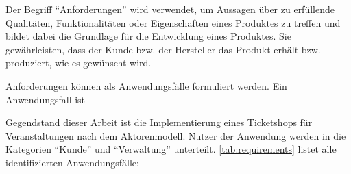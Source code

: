 Der Begriff \enquote{Anforderungen} wird verwendet, um Aussagen über zu erfüllende Qualitäten, Funktionalitäten oder Eigenschaften eines Produktes zu treffen und bildet dabei die Grundlage für die Entwicklung eines Produktes.
Sie gewährleisten, dass der Kunde bzw. der Hersteller das Produkt erhält bzw. produziert, wie es gewünscht wird.\unskip{}

Anforderungen können als Anwendungsfälle formuliert werden.
Ein Anwendungsfall ist 

Gegendstand dieser Arbeit ist die Implementierung eines Ticketshops für Veranstaltungen nach dem Aktorenmodell.
Nutzer der Anwendung werden in die Kategorien \enquote{Kunde} und \enquote{Verwaltung} unterteilt.
\autoref{tab:requirements} listet alle identifizierten Anwendungsfälle:

